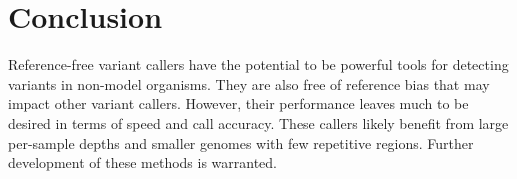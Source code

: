 
\section{Conclusion}

Reference-free variant callers have the potential to be powerful tools for detecting variants in non-model organisms. They are also free of reference bias that may impact other variant callers. However, their performance leaves much to be desired in terms of speed and call accuracy. These callers likely benefit from large per-sample depths and smaller genomes with few repetitive regions. Further development of these methods is warranted.

\printbibliography
